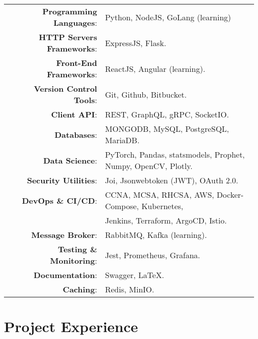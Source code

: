\documentclass[a4paper,10pt]{article}
\begin{document}
\begin{tabular}{rl}	
    \textbf{Programming Languages}:& Python, NodeJS, GoLang (learning)\\
    \textbf{HTTP Servers Frameworks}:& ExpressJS, Flask.\\
    \textbf{Front-End Frameworks}:& ReactJS, Angular (learning).\\
    \textbf{Version Control Tools}:& Git, Github, Bitbucket.\\
    \textbf{Client API}:& REST, GraphQL, gRPC, SocketIO.\\
    \textbf{Databases}:& MONGODB, MySQL, PostgreSQL, MariaDB.\\
    \textbf{Data Science}:& PyTorch, Pandas, statsmodels, Prophet, Numpy, OpenCV, Plotly.\\
    \textbf{Security Utilities}:& Joi, Jsonwebtoken (JWT), OAuth 2.0.\\ 
    \textbf{DevOps \& CI/CD}:& CCNA, MCSA, RHCSA, AWS, Docker-Compose, Kubernetes,\\
                            & Jenkins, Terraform, ArgoCD, Istio. \\
    \textbf{Message Broker}:& RabbitMQ, Kafka (learning).\\
    \textbf{Testing \& Monitoring}:& Jest, Prometheus, Grafana.\\ 
    \textbf{Documentation}:& Swagger, \LaTeX.\\
    \textbf{Caching}:& Redis, MinIO.\\
\end{tabular}

 
\section{\textbf{Project Experience}}  
\end{document}
